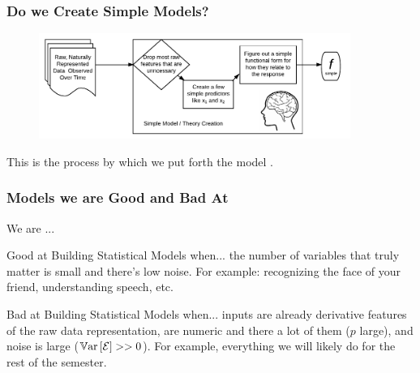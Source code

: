 \documentclass[slides]{beamer} %
\begin{document}
\begin{frame}\frametitle{Do we Create Simple Models?}

\begin{figure}
\centering
\includegraphics[width=4in]{human_simple_model_learning}
\end{figure}

This is the process by which we put forth the model .

\end{frame}


\begin{frame}\frametitle{Models we are Good and Bad At}
\small

We are ...

\begin{block}{Good at Building Statistical Models when...}
the number of variables that truly matter is small and there's low noise. For example: recognizing the face of your friend, understanding speech, etc.
\end{block}
	
\begin{block}{Bad at Building Statistical Models when...}
inputs are already derivative features of the raw data representation, are numeric and there a lot of them ($p$ large), and noise is large ($\mathbb{V}\text{ar}\left[\mathcal{E}\right] >> 0$). For example, everything we will likely do for the rest of the semester.
\end{block}


\end{frame}
\end{document}
